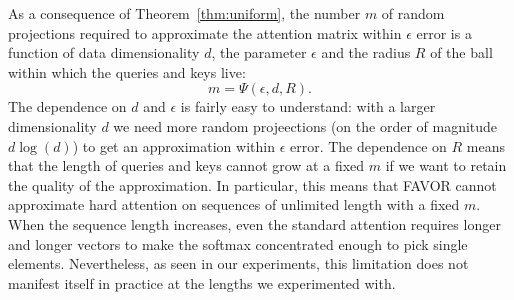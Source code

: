 As a consequence of Theorem~\ref{thm:uniform}, the number $m$ of random projections required to approximate the attention matrix within $\epsilon$ error is a function of data dimensionality $d$, the parameter $\epsilon$ and the radius $R$ of the ball within which the queries and keys live:
\[ m = \Psi(\epsilon, d, R). \]
The dependence on $d$ and $\epsilon$ is fairly easy to understand: with a larger dimensionality $d$ we need more random projeections (on the order of magnitude $d\log(d)$) to get an approximation within $\epsilon$ error. The dependence on $R$ means that the length of queries and keys cannot grow at a fixed $m$ if we want to retain the quality of the approximation.
In particular, this means that FAVOR cannot approximate hard attention on sequences of unlimited length with a fixed $m$. When the sequence length increases, even the standard attention requires longer and longer vectors to make the softmax concentrated enough to pick single elements. Nevertheless, as seen in our experiments, this limitation does not manifest itself in practice at the lengths we experimented with.